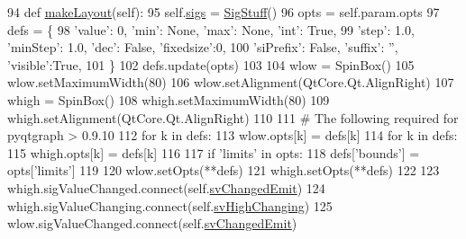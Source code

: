 \begin{DoxyCode}
94     \textcolor{keyword}{def }\hyperlink{classsoftware_1_1chipwhisperer_1_1common_1_1ui_1_1ParameterTypesCustom_1_1RangeParameterItem_a9b6fc2a6cd7cebd83d049b9ea5eab51c}{makeLayout}(self):
95         self.\hyperlink{classsoftware_1_1chipwhisperer_1_1common_1_1ui_1_1ParameterTypesCustom_1_1RangeParameterItem_a8ad50b74f2692b060deb223fe9ff74ab}{sigs} = \hyperlink{classsoftware_1_1chipwhisperer_1_1common_1_1ui_1_1ParameterTypesCustom_1_1SigStuff}{SigStuff}()
96         opts = self.param.opts
97         defs = \{
98                 \textcolor{stringliteral}{'value'}: 0, \textcolor{stringliteral}{'min'}: \textcolor{keywordtype}{None}, \textcolor{stringliteral}{'max'}: \textcolor{keywordtype}{None}, \textcolor{stringliteral}{'int'}: \textcolor{keyword}{True},
99                 \textcolor{stringliteral}{'step'}: 1.0, \textcolor{stringliteral}{'minStep'}: 1.0, \textcolor{stringliteral}{'dec'}: \textcolor{keyword}{False}, \textcolor{stringliteral}{'fixedsize'}:0,
100                 \textcolor{stringliteral}{'siPrefix'}: \textcolor{keyword}{False}, \textcolor{stringliteral}{'suffix'}: \textcolor{stringliteral}{''}, \textcolor{stringliteral}{'visible'}:\textcolor{keyword}{True},
101             \}
102         defs.update(opts)
103 
104         wlow = SpinBox()
105         wlow.setMaximumWidth(80)
106         wlow.setAlignment(QtCore.Qt.AlignRight)
107         whigh = SpinBox()
108         whigh.setMaximumWidth(80)
109         whigh.setAlignment(QtCore.Qt.AlignRight)
110 
111         \textcolor{comment}{# The following required for pyqtgraph > 0.9.10}
112         \textcolor{keywordflow}{for} k \textcolor{keywordflow}{in} defs:
113             wlow.opts[k] = defs[k]
114         \textcolor{keywordflow}{for} k \textcolor{keywordflow}{in} defs:
115             whigh.opts[k] = defs[k]
116 
117         \textcolor{keywordflow}{if} \textcolor{stringliteral}{'limits'} \textcolor{keywordflow}{in} opts:
118             defs[\textcolor{stringliteral}{'bounds'}] = opts[\textcolor{stringliteral}{'limits'}]
119 
120         wlow.setOpts(**defs)
121         whigh.setOpts(**defs)
122 
123         whigh.sigValueChanged.connect(self.\hyperlink{classsoftware_1_1chipwhisperer_1_1common_1_1ui_1_1ParameterTypesCustom_1_1RangeParameterItem_af3dfe1f63b7206f3d674d6b132f67856}{svChangedEmit})
124         whigh.sigValueChanging.connect(self.\hyperlink{classsoftware_1_1chipwhisperer_1_1common_1_1ui_1_1ParameterTypesCustom_1_1RangeParameterItem_a3d17bd64572aaef9e66f1ff25461c857}{svHighChanging})
125         wlow.sigValueChanged.connect(self.\hyperlink{classsoftware_1_1chipwhisperer_1_1common_1_1ui_1_1ParameterTypesCustom_1_1RangeParameterItem_af3dfe1f63b7206f3d674d6b132f67856}{svChangedEmit})

\end{DoxyCode}
